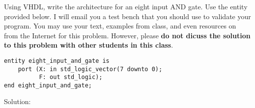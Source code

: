 Using VHDL, write the architecture for an eight input AND gate.  Use the entity provided below.  I will email you a test bench that you should use to validate your program.  You may use your text, examples from class, and even resources on from the Internet for this problem.  However, please \textbf{do not dicuss the solution to this problem with other students in this class}.\\
\lstset{language=VHDL}
\begin{lstlisting}
entity eight_input_and_gate is
    port (X: in std_logic_vector(7 downto 0);
          F: out std_logic);
end eight_input_and_gate;
\end{lstlisting}

Solution: \\ \\

